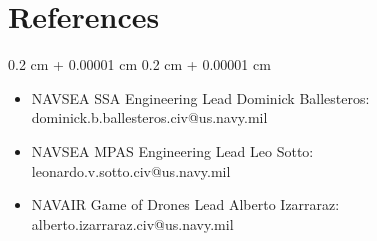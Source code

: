 \documentclass[10pt, letterpaper]{article}
\newenvironment{highlights}{
    \begin{itemize}[
        topsep=0.10 cm,
        parsep=0.10 cm,
        partopsep=0pt,
        itemsep=0pt,
        leftmargin=0.4 cm + 10pt
    ]
}{
    \end{itemize}
} %
\newenvironment{onecolentry}{
    \begin{adjustwidth}{
        0.2 cm + 0.00001 cm
    }{
        0.2 cm + 0.00001 cm
    }
}{
    \end{adjustwidth}
} %
\begin{document}
    \section{References}
        
        \begin{onecolentry}
            \begin{highlights}
                \item NAVSEA SSA Engineering Lead Dominick Ballesteros: dominick.b.ballesteros.civ@us.navy.mil
                \item NAVSEA MPAS Engineering Lead Leo Sotto: leonardo.v.sotto.civ@us.navy.mil
                \item NAVAIR Game of Drones Lead Alberto Izarraraz: alberto.izarraraz.civ@us.navy.mil
            \end{highlights}
        \end{onecolentry}
\end{document}
